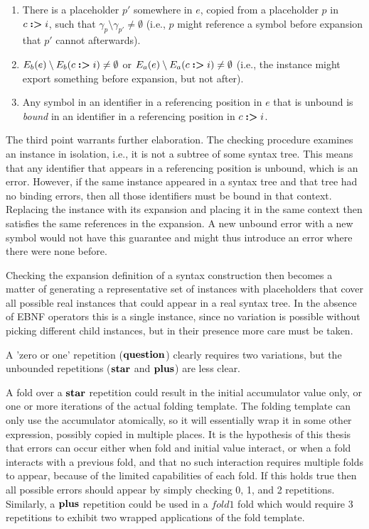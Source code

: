 \documentclass{kththesis}
\begin{document}
\begin{enumerate}
  \item There is a placeholder $p'$ somewhere in $e$, copied from a placeholder $p$ in $c \mathrel{\textbf{:>}} i$, such that $\gamma_p \setminus \gamma_{p'} \neq \emptyset$ (i.e., $p$ might reference a symbol before expansion that $p'$ cannot afterwards).
  \item $E_b(e) \setminus E_b(c \mathrel{\textbf{:>}} i) \neq \emptyset$ or $E_a(e) \setminus E_a(c \mathrel{\textbf{:>}} i) \neq \emptyset$ (i.e., the instance might export something before expansion, but not after).
  \item Any symbol in an identifier in a referencing position in $e$ that is unbound is \emph{bound} in an identifier in a referencing position in $c \mathrel{\textbf{:>}} i$.
\end{enumerate}

The third point warrants further elaboration. The checking procedure examines an instance in isolation, i.e., it is not a subtree of some syntax tree. This means that any identifier that appears in a referencing position is unbound, which is an error. However, if the same instance appeared in a syntax tree and that tree had no binding errors, then all those identifiers must be bound in that context. Replacing the instance with its expansion and placing it in the same context then satisfies the same references in the expansion. A new unbound error with a new symbol would not have this guarantee and might thus introduce an error where there were none before.

Checking the expansion definition of a syntax construction then becomes a matter of generating a representative set of instances with placeholders that cover all possible real instances that could appear in a real syntax tree. In the absence of EBNF operators this is a single instance, since no variation is possible without picking different child instances, but in their presence more care must be taken.

A 'zero or one' repetition ($\mathrel{\mathbf{question}}$) clearly requires two variations, but the unbounded repetitions ($\mathrel{\mathbf{star}}$ and $\mathrel{\mathbf{plus}}$) are less clear.

A fold over a $\mathrel{\mathbf{star}}$ repetition could result in the initial accumulator value only, or one or more iterations of the actual folding template. The folding template can only use the accumulator atomically, so it will essentially wrap it in some other expression, possibly copied in multiple places. It is the hypothesis of this thesis that errors can occur either when fold and initial value interact, or when a fold interacts with a previous fold, and that no such interaction requires multiple folds to appear, because of the limited capabilities of each fold. If this holds true then all possible errors should appear by simply checking 0, 1, and 2 repetitions. Similarly, a $\mathrel{\mathbf{plus}}$ repetition could be used in a $\mathit{fold1}$ fold which would require 3 repetitions to exhibit two wrapped applications of the fold template.
\end{document}
